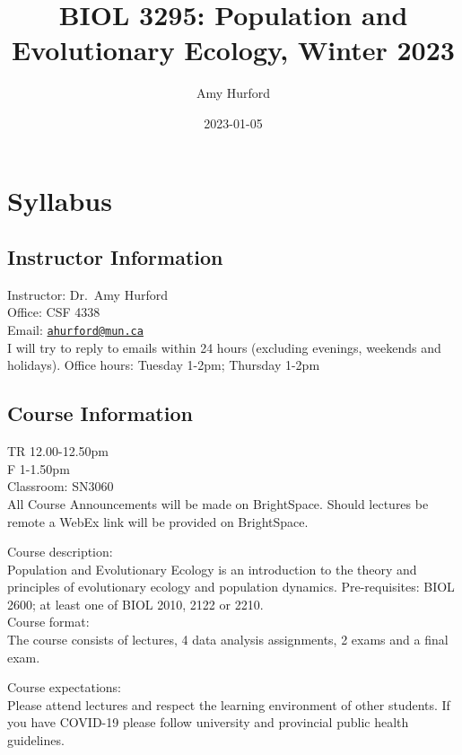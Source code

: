 \documentclass[
]{book}
\title{BIOL 3295: Population and Evolutionary Ecology, Winter 2023}
\author{Amy Hurford}
\date{2023-01-05}
\begin{document}
\maketitle

{
\setcounter{tocdepth}{1}
\tableofcontents
}
\hypertarget{syllabus}{%
\chapter{Syllabus}\label{syllabus}}

\hypertarget{instructor-information}{%
\section{Instructor Information}\label{instructor-information}}

Instructor: Dr.~Amy Hurford\\
Office: CSF 4338\\
Email: \href{mailto:ahurford@mun.ca}{\nolinkurl{ahurford@mun.ca}}\\
I will try to reply to emails within 24 hours (excluding evenings, weekends and holidays).
Office hours: Tuesday 1-2pm; Thursday 1-2pm

\hypertarget{course-information}{%
\section{Course Information}\label{course-information}}

TR 12.00-12.50pm\\
F 1-1.50pm\\
Classroom: SN3060\\

All Course Announcements will be made on BrightSpace. Should lectures be remote a WebEx link will be provided on BrightSpace.

Course description:\\
Population and Evolutionary Ecology is an introduction to the theory and principles of evolutionary ecology and population dynamics. Pre-requisites: BIOL 2600; at least one of BIOL 2010, 2122 or 2210.\\

Course format:\\
The course consists of lectures, 4 data analysis assignments, 2 exams and a final exam.~

Course expectations:\\
Please attend lectures and respect the learning environment of other students. If you have COVID-19 please follow university and provincial public health guidelines.\\
\end{document}
